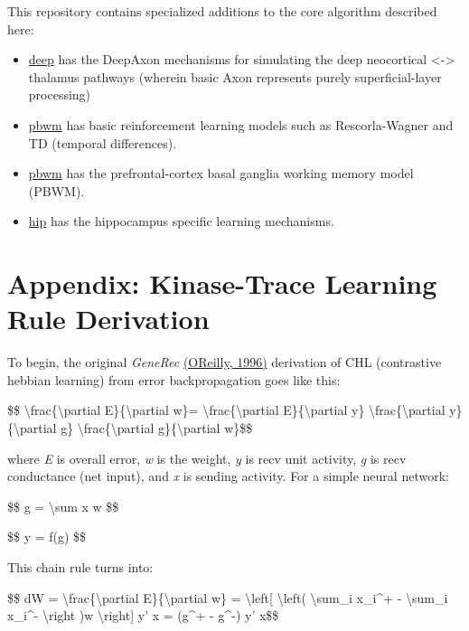 \documentclass[11pt,twoside]{article}
\newif\myifpdf
\begin{document}
This repository contains specialized additions to the core algorithm
described here:

\begin{itemize}
\tightlist
\item
  \href{https://github.com/emer/axon/blob/master/deep}{deep} has the
  DeepAxon mechanisms for simulating the deep neocortical
  \textless-\textgreater{} thalamus pathways (wherein basic Axon
  represents purely superficial-layer processing)
\item
  \href{https://github.com/emer/axon/blob/master/rl}{pbwm} has basic
  reinforcement learning models such as Rescorla-Wagner and TD (temporal
  differences).
\item
  \href{https://github.com/emer/axon/blob/master/pbwm1}{pbwm} has the
  prefrontal-cortex basal ganglia working memory model (PBWM).
\item
  \href{https://github.com/emer/axon/blob/master/hip}{hip} has the
  hippocampus specific learning mechanisms.
\end{itemize}

\hypertarget{appendix-kinase-trace-learning-rule-derivation}{%
\section{Appendix: Kinase-Trace Learning Rule
Derivation}\label{appendix-kinase-trace-learning-rule-derivation}}

To begin, the original \emph{GeneRec}
\protect\hyperlink{references}{(OReilly, 1996)} derivation of CHL
(contrastive hebbian learning) from error backpropagation goes like
this:

\$\$ \textbackslash frac\{\textbackslash partial
E\}\{\textbackslash partial w\}=
\textbackslash frac\{\textbackslash partial E\}\{\textbackslash partial
y\} \textbackslash frac\{\textbackslash partial
y\}\{\textbackslash partial g\}
\textbackslash frac\{\textbackslash partial g\}\{\textbackslash partial
w\}\$\$

where \emph{E} is overall error, \emph{w} is the weight, \emph{y} is
recv unit activity, \emph{g} is recv conductance (net input), and
\emph{x} is sending activity. For a simple neural network:

\$\$ g = \textbackslash sum x w \$\$

\$\$ y = f(g) \$\$

This chain rule turns into:

\$\$ dW = \textbackslash frac\{\textbackslash partial
E\}\{\textbackslash partial w\} = \textbackslash left{[}
\textbackslash left( \textbackslash sum\_i x\_i\^{}+ -
\textbackslash sum\_i x\_i\^{}- \textbackslash right )w
\textbackslash right{]} y' x = (g\^{}+ - g\^{}-) y' x\$\$
\end{document}
